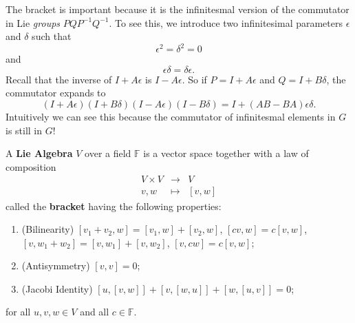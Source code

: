 The bracket is important because it is the infinitesmal version of the commutator in Lie \emph{groups}
$PQP^{-1}Q^{-1}$. To see this, we introduce two infinitesimal parameters $\epsilon$
and $\delta$ such that
\begin{equation}
\epsilon^2 = \delta^2 = 0
\end{equation}
and
\begin{equation}
\epsilon\delta = \delta\epsilon.
\end{equation}
Recall that the inverse of $I+A\epsilon$ is $I-A\epsilon$. So if $P=I+A\epsilon$
and $Q=I+B\delta$, the commutator expands to
\begin{equation}
(I+A\epsilon)(I+B\delta)(I-A\epsilon)(I-B\delta) = I + (AB - BA)\epsilon\delta.
\end{equation}
Intuitively we can see this because the commutator of infinitesmal elements in
$G$ is still in $G$!

\begin{defn}
A \textbf{Lie Algebra} $V$ over a field $\mathbb{F}$ is a vector space together
with a law of composition
\begin{eqnarray*}
V\times V &\to& V \\
v,w & \mapsto & [v,w]
\end{eqnarray*}
called the \textbf{bracket} having the following properties:
\begin{enumerate}
\item (Bilinearity) $[v_1 + v_2,w] = [v_1,w] + [v_2,w]$, $[cv,w] = c[v,w]$, $[v,w_1 + w_2] = [v,w_1] + [v,w_2]$, $[v,cw] = c[v,w]$;
\item (Antisymmetry) $[v,v]=0$;
\item (Jacobi Identity) $[u,[v,w]] + [v,[w,u]] + [w,[u,v]] = 0$;
\end{enumerate}
for all $u,v,w\in V$ and all $c\in\mathbb{F}$.
\end{defn}
